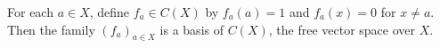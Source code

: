 For each $a \in X$, define $f_a \in C(X)$ by $f_a(a) = 1$ and $f_a(x) = 0$ for $x \neq a$. Then the family $(f_a)_{a \in X}$ is a basis of $C(X)$, the free vector space over $X$.
